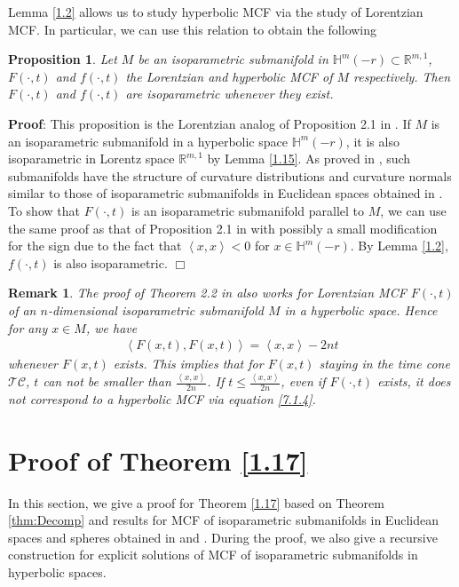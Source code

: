 \documentclass[12pt]{article}
\newtheorem{prop}[lem]{Proposition}
\newtheorem{rmk}[lem]{Remark}
\begin{document}
Lemma \ref{1.2} allows us to study hyperbolic MCF via the study of Lorentzian MCF.
In particular, we can use this relation to obtain the following
\begin{prop}
Let $M$ be an isoparametric submanifold in $\mathbb{H}^{m}(-r)\subset \mathbb R^{m,1}$, $F(\cdot, t)$ and $f(\cdot, t)$
the Lorentzian and hyperbolic MCF of $M$ respectively.
Then $F(\cdot, t)$ and $f(\cdot, t)$ are isoparametric whenever they exist.
\end{prop}
\noindent
{\bf Proof}:
This proposition is the Lorentzian analog of Proposition 2.1 in \cite{X.CT}.
If $M$ is an isoparametric submanifold in a hyperbolic space $\mathbb{H}^m(-r)$, it is also isoparametric
in Lorentz space $\mathbb{R}^{m,1}$ by Lemma \ref{1.15}. As proved in \cite{B.W}, such submanifolds have
the structure of curvature distributions and curvature normals similar to those of isoparametric submanifolds
in Euclidean spaces obtained in \cite{T.C}. To show that $F(\cdot, t)$ is an isoparametric submanifold parallel
to $M$, we can use
the same proof as that of Proposition 2.1 in \cite{X.CT} with possibly a small modification for the sign due to the fact that $\left< x, x \right> < 0$ for $x \in \mathbb{H}^m(-r)$.
By Lemma \ref{1.2}, $f(\cdot, t)$ is also isoparametric.
$\Box$

\begin{rmk}	
The proof of Theorem 2.2 in \cite{X.CT} also works for Lorentzian MCF $F(\cdot, t)$ of an $n$-dimensional isoparametric
submanifold $M$ in a hyperbolic space. Hence for any $x \in M$, we have
	\begin{align}
				\left<F(x,t), F(x, t) \right> = \left<x, x \right> - 2nt \label{3.2}
	\end{align}
whenever $F(x, t)$ exists. This implies that for $F(x, t)$ staying in the time cone $\mathcal{TC}$, $t$ can not be smaller than $\frac{\left<x, x \right>}{2n}$. If $t \leq \frac{\left<x, x \right>}{2n}$, even if $F(\cdot, t)$ exists, it does not correspond to a hyperbolic MCF via equation \eqref{7.1.4}.
\end{rmk}
	


\section{Proof of Theorem \ref{1.17}} \label{1.6}	

In this section, we give a proof for Theorem \ref{1.17} based on Theorem \ref{thm:Decomp} and results for MCF
of isoparametric submanifolds in Euclidean spaces and spheres obtained in \cite{X.CT} and \cite{X.C}.
During the proof, we also give a recursive
construction for explicit solutions of MCF of isoparametric submanifolds in hyperbolic spaces.
\end{document}
